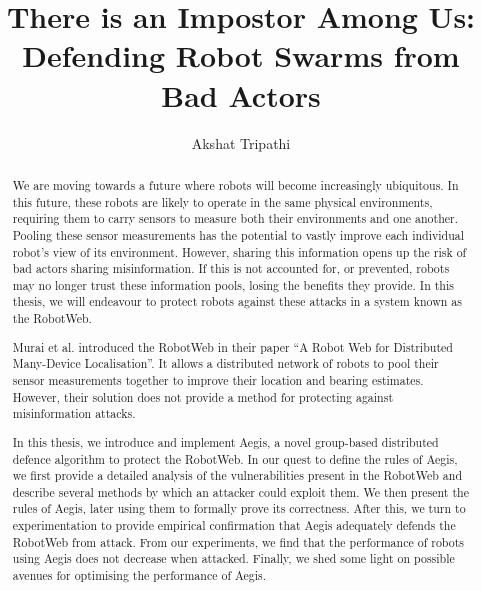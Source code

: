 \documentclass[a4paper, twoside]{report}
\title{There is an Impostor Among Us:\\Defending Robot Swarms from Bad Actors}
\author{Akshat Tripathi}
\begin{document}



\begin{abstract}
We are moving towards a future where robots will become increasingly ubiquitous. In this future, these robots are likely to operate in the same physical environments, requiring them to carry sensors to measure both their environments and one another. Pooling these sensor measurements has the potential to vastly improve each individual robot's view of its environment. However, sharing this information opens up the risk of bad actors sharing misinformation. If this is not accounted for, or prevented, robots may no longer trust these information pools, losing the benefits they provide. In this thesis, we will endeavour to protect robots against these attacks in a system known as the RobotWeb. 

Murai et al. introduced the RobotWeb in their paper ``A Robot Web for Distributed Many-Device Localisation''. It allows a distributed network of robots to pool their sensor measurements together to improve their location and bearing estimates. However, their solution does not provide a method for protecting against misinformation attacks.

In this thesis, we introduce and implement Aegis, a novel group-based distributed defence algorithm to protect the RobotWeb. In our quest to define the rules of Aegis, we first provide a detailed analysis of the vulnerabilities present in the RobotWeb and describe several methods by which an attacker could exploit them. We then present the rules of Aegis, later using them to formally prove its correctness. After this, we turn to experimentation to provide empirical confirmation that Aegis adequately defends the RobotWeb from attack. From our experiments, we find that the performance of robots using Aegis does not decrease when attacked. Finally, we shed some light on possible avenues for optimising the performance of Aegis. 
\end{abstract}
\end{document}
